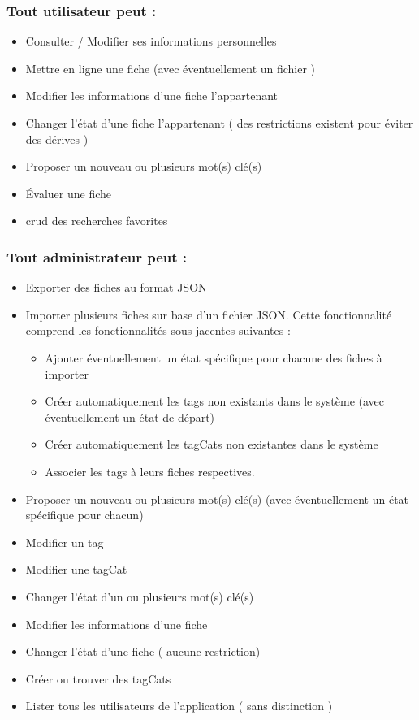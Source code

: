 \subsubsection*{Tout utilisateur peut : }
\begin{itemize}
    \item Consulter / Modifier ses informations personnelles
    \item Mettre en ligne une \gls{fiche}  (avec éventuellement un fichier )
    \item Modifier les informations d'une \gls{fiche}  l'appartenant
    \item Changer l'état d'une \gls{fiche}  l'appartenant ( des restrictions existent pour éviter des dérives )
    \item Proposer un nouveau ou plusieurs mot(s) clé(s)
    \item Évaluer une \gls{fiche}  
    \item \Gls{crud} des recherches favorites
\end{itemize}

\subsubsection*{Tout administrateur peut : }
\begin{itemize}
    \item Exporter des \glspl{fiche} au format JSON
    \item Importer plusieurs \glspl{fiche} sur base d'un fichier JSON.
        Cette fonctionnalité comprend les fonctionnalités sous jacentes suivantes :
        \begin{itemize}
            \item Ajouter éventuellement un état spécifique pour chacune des \glspl{fiche} à importer
            \item Créer automatiquement les \glspl{tag} non existants dans le système (avec éventuellement un état de départ)
            \item Créer automatiquement les \glspl{tagCat} non existantes dans le système
            \item Associer les \glspl{tag} à leurs \glspl{fiche} respectives. 
        \end{itemize}
    \item Proposer un nouveau ou plusieurs mot(s) clé(s) (avec éventuellement un état spécifique pour chacun)
    \item Modifier un \gls{tag} 
    \item Modifier une \gls{tagCat} 
    \item Changer l'état d'un ou plusieurs mot(s) clé(s)
    \item Modifier les informations d'une \gls{fiche} 
    \item Changer l'état d'une \gls{fiche} ( aucune restriction)
    \item Créer ou trouver des \glspl{tagCat}
    \item Lister tous les utilisateurs de l'application ( sans distinction )
\end{itemize}

